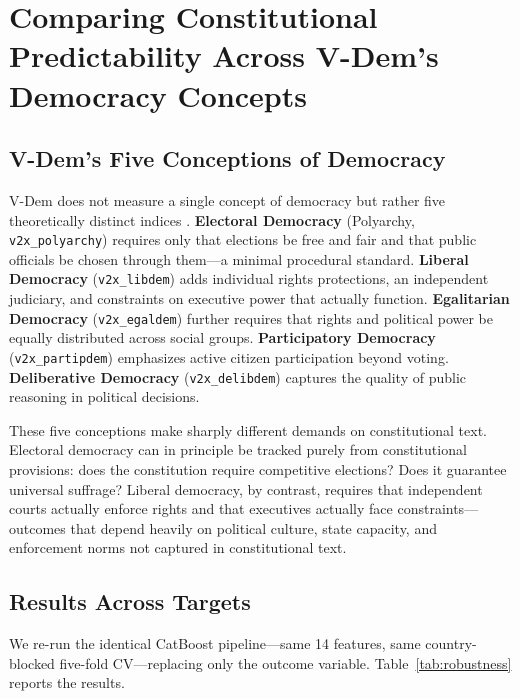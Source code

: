 \documentclass[9pt,twoside]{pnas-new}
\begin{document}
\section*{Comparing Constitutional Predictability Across V-Dem's Democracy Concepts}

\subsection*{V-Dem's Five Conceptions of Democracy}

V-Dem does not measure a single concept of democracy but rather five theoretically distinct indices \cite{coppedge_vdem_2024}. \textbf{Electoral Democracy} (Polyarchy, \texttt{v2x\_polyarchy}) requires only that elections be free and fair and that public officials be chosen through them---a minimal procedural standard. \textbf{Liberal Democracy} (\texttt{v2x\_libdem}) adds individual rights protections, an independent judiciary, and constraints on executive power that actually function. \textbf{Egalitarian Democracy} (\texttt{v2x\_egaldem}) further requires that rights and political power be equally distributed across social groups. \textbf{Participatory Democracy} (\texttt{v2x\_partipdem}) emphasizes active citizen participation beyond voting. \textbf{Deliberative Democracy} (\texttt{v2x\_delibdem}) captures the quality of public reasoning in political decisions.

These five conceptions make sharply different demands on constitutional text. Electoral democracy can in principle be tracked purely from constitutional provisions: does the constitution require competitive elections? Does it guarantee universal suffrage? Liberal democracy, by contrast, requires that independent courts actually enforce rights and that executives actually face constraints---outcomes that depend heavily on political culture, state capacity, and enforcement norms not captured in constitutional text.

\subsection*{Results Across Targets}

We re-run the identical CatBoost pipeline---same 14 features, same country-blocked five-fold CV---replacing only the outcome variable. Table~\ref{tab:robustness} reports the results.
\end{document}
